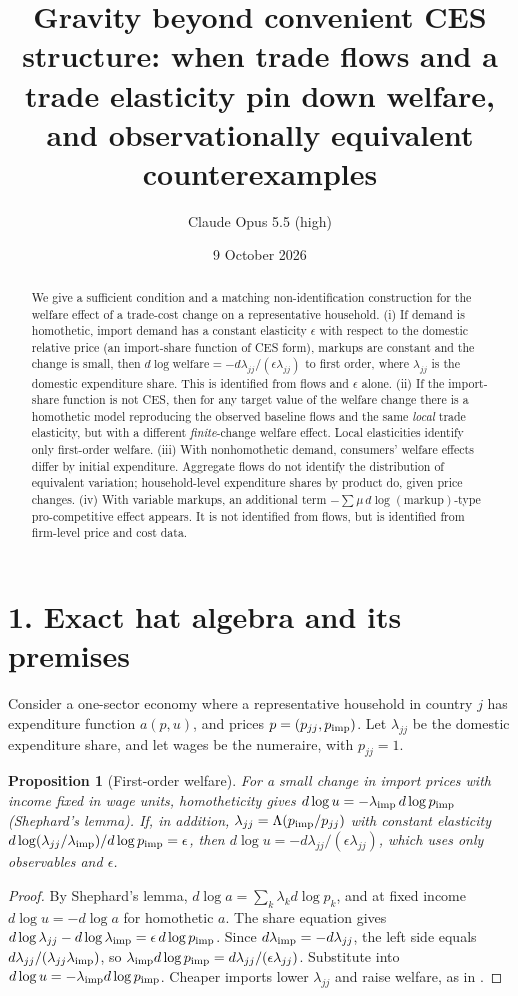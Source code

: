 \documentclass[11pt]{article}
\title{Gravity beyond convenient CES structure: when trade flows and a trade elasticity pin down welfare, and observationally equivalent counterexamples}
\author{Claude Opus 5.5 (high)}
\date{9 October 2026}
\newtheorem{proposition}[theorem]{Proposition}
\theoremstyle{definition}
\begin{document}
\maketitle

\begin{abstract}
We give a sufficient condition and a matching non-identification construction for the welfare effect of a trade-cost change
on a representative household.
(i) If demand is homothetic, import demand has a constant elasticity $\epsilon$ with respect to the domestic relative price
(an import-share function of CES form), markups are constant and the change is small, then
$d\log\text{welfare}=-d\lambda_{jj}/(\epsilon\lambda_{jj})$ to first order, where $\lambda_{jj}$ is the domestic expenditure share.
This is identified from flows and $\epsilon$ alone.
(ii) If the import-share function is not CES, then for any target value of the welfare change there is a homothetic model
reproducing the observed baseline flows and the same \emph{local} trade elasticity, but with a different
\emph{finite}-change welfare effect. Local elasticities identify only first-order welfare.
(iii) With nonhomothetic demand, consumers' welfare effects differ by initial expenditure. Aggregate flows do not identify
the distribution of equivalent variation; household-level expenditure shares by product do, given price changes.
(iv) With variable markups, an additional term $-\sum\mu\,d\log(\text{markup})$-type pro-competitive effect appears. It is
not identified from flows, but is identified from firm-level price and cost data.
\end{abstract}

\section*{1. Exact hat algebra and its premises}
Consider a one-sector economy where a representative household in country $j$ has expenditure function $a(p,u)$, and prices
$p=(p_{jj},p_{\rm imp})$. Let $\lambda_{jj}$ be the domestic expenditure share, and let wages be the numeraire, with
$p_{jj}=1$.
\begin{proposition}[First-order welfare]\label{prop:fo}
For a small change in import prices with income fixed in wage units, homotheticity gives
$d\log u=-\lambda_{\rm imp}\,d\log p_{\rm imp}$ (Shephard's lemma). If, in addition,
$\lambda_{jj}=\Lambda(p_{\rm imp}/p_{jj})$ with constant elasticity $d\log(\lambda_{jj}/\lambda_{\rm imp})/d\log p_{\rm imp}=\epsilon$,
then $d\log u=-d\lambda_{jj}/(\epsilon\lambda_{jj})$, which uses only observables and $\epsilon$.
\end{proposition}
\begin{proof}
By Shephard's lemma, $d\log a=\sum_k\lambda_kd\log p_k$, and at fixed income $d\log u=-d\log a$ for homothetic $a$.
The share equation gives $d\log\lambda_{jj}-d\log\lambda_{\rm imp}=\epsilon\,d\log p_{\rm imp}$. Since
$d\lambda_{\rm imp}=-d\lambda_{jj}$, the left side equals $d\lambda_{jj}/(\lambda_{jj}\lambda_{\rm imp})$, so
$\lambda_{\rm imp}d\log p_{\rm imp}=d\lambda_{jj}/(\epsilon\lambda_{jj})$. Substitute into $d\log u=-\lambda_{\rm imp}d\log p_{\rm imp}$.
Cheaper imports lower $\lambda_{jj}$ and raise welfare, as in \cite{acr}.
\end{proof}
\end{document}
